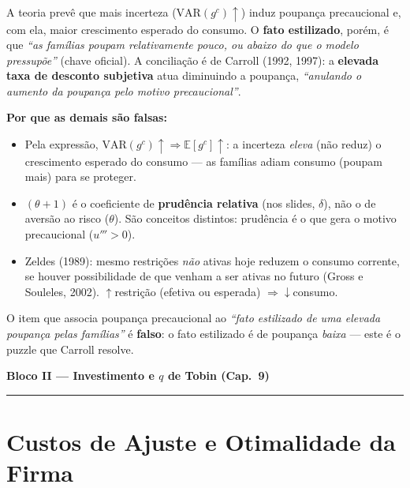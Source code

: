 \documentclass[12pt, a4paper]{article}
\newcommand{\E}{\mathbb{E}}
\newcommand{\VAR}{\mathrm{VAR}}
\begin{document}
\begin{correctbox}[title={Resposta correta: b)}]
A teoria prevê que mais incerteza ($\VAR(g^c)\uparrow$) induz poupança
precaucional e, com ela, maior crescimento esperado do consumo. O
\textbf{fato estilizado}, porém, é que \emph{``as famílias poupam relativamente
pouco, ou abaixo do que o modelo pressupõe''} (chave oficial). A conciliação é
de Carroll (1992, 1997): a \textbf{elevada taxa de desconto subjetiva} atua
diminuindo a poupança, \emph{``anulando o aumento da poupança pelo motivo
precaucional''}. \checkmark

\textbf{Por que as demais são falsas:}
\begin{itemize}[leftmargin=*]
\item[a)] Pela expressão, $\VAR(g^c)\uparrow \Rightarrow \E[g^c]\uparrow$: a
incerteza \emph{eleva} (não reduz) o crescimento esperado do consumo --- as
famílias adiam consumo (poupam mais) para se proteger.
\item[c)] $(\theta+1)$ é o coeficiente de \textbf{prudência relativa} (nos
slides, $\delta$), não o de aversão ao risco ($\theta$). São conceitos
distintos: prudência é o que gera o motivo precaucional ($u''' > 0$).
\item[d)] Zeldes (1989): mesmo restrições \emph{não} ativas hoje reduzem o
consumo corrente, se houver possibilidade de que venham a ser ativas no futuro
(Gross e Souleles, 2002). $\uparrow$restrição (efetiva ou esperada)
$\Rightarrow \downarrow$consumo.
\end{itemize}
\end{correctbox}

\begin{formulabox}[title={Atenção à armadilha da P2 2021/2024 (Q1-iv)}]
O item que associa poupança precaucional ao \emph{``fato estilizado de uma
elevada poupança pelas famílias''} é \textbf{falso}: o fato estilizado é de
poupança \emph{baixa} --- este é o puzzle que Carroll resolve.
\end{formulabox}

\newpage
\begin{center}
{\large\bfseries\color{cyanrbc} Bloco II --- Investimento e $q$ de Tobin (Cap.\ 9)}\\[0.2em]
\rule{\linewidth}{0.6pt}
\end{center}

\section{Custos de Ajuste e Otimalidade da Firma}
\end{document}
